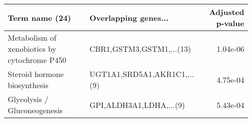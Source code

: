 \begin{tabular}{llr}
\toprule
                              Term name (24) &        Overlapping genes... &  Adjusted p-value \\
\midrule
Metabolism of xenobiotics by cytochrome P450 &    CBR1,GSTM3,GSTM1,...(13) &          1.04e-06 \\
                Steroid hormone biosynthesis & UGT1A1,SRD5A1,AKR1C1,...(9) &          4.75e-04 \\
                Glycolysis / Gluconeogenesis &     GPI,ALDH3A1,LDHA,...(9) &          5.43e-04 \\
\bottomrule
\end{tabular}
